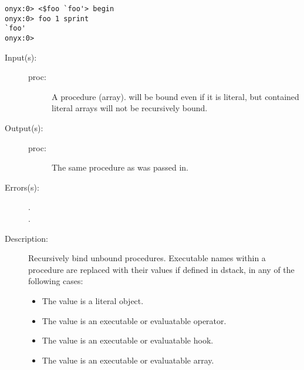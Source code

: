 \begin{description}
\begin{description}
\begin{verbatim}
onyx:0> <$foo `foo'> begin
onyx:0> foo 1 sprint
`foo'
onyx:0>
		\end{verbatim}
	\end{description}
\label{systemdict:bind}
\item[{\onyxop{proc}{bind}{proc}}: ]
	\begin{description}\item[]
	\item[Input(s): ]
		\begin{description}\item[]
		\item[proc: ]
			A procedure (array).   will be bound even if
			it is literal, but contained literal arrays will not be
			recursively bound.
		\end{description}
	\item[Output(s): ]
		\begin{description}\item[]
		\item[proc: ]
			The same procedure as was passed in.
		\end{description}
	\item[Errors(s): ]
		\begin{description}\item[]
		\item[.]
		\item[.]
		\end{description}
	\item[Description: ]
		Recursively bind unbound procedures.  Executable names within a
		procedure are replaced with their values if defined in dstack,
		in any of the following cases:
		\begin{itemize}
		\item{The value is a literal object.}
		\item{The value is an executable or evaluatable operator.}
		\item{The value is an executable or evaluatable hook.}
		\item{The value is an executable or evaluatable array.}
		\end{itemize}


\end{description}
\end{description}
